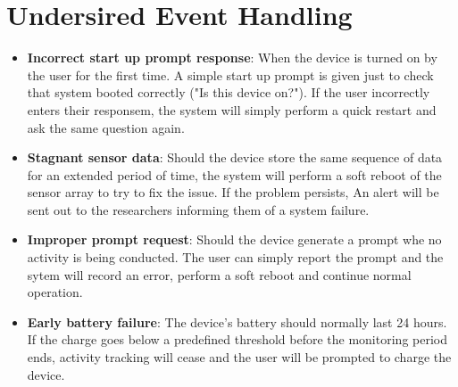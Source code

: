 \documentclass[12pt]{article}
\begin{document}
\section{Undersired Event Handling}
\label{UEH}
\begin{itemize}
	\item \textbf{Incorrect start up prompt response}: When the device is turned on by the user for the first time. A simple start up prompt is given just to check that system booted correctly ("Is this device on?"). If the user incorrectly enters their responsem, the system will simply 				perform a quick restart and ask the same question again.

	\item \textbf{Stagnant sensor data}: Should the device store the same sequence of data for an extended period of time, the system will perform a soft reboot of the sensor array to try to fix the issue. If the problem persists, An alert will be sent out to the researchers informing them 			of a system failure.

	\item \textbf{Improper prompt request}: Should the device generate a prompt whe no activity is being conducted. The user can simply report the prompt and the sytem will record an error, perform a soft reboot and continue normal operation.

	\item \textbf{Early battery failure}: The device's battery should normally last 24 hours. If the charge goes below a predefined threshold before the monitoring period ends, activity tracking will cease and the user will be prompted to charge the device.
\end{itemize}





\pagebreak
\end{document}

